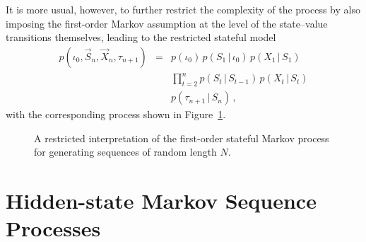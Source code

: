 \documentclass[a4paper]{article}
\begin{document}
It is more usual, however, to further restrict the complexity of the process 
by also imposing the first-order Markov assumption at the level
of the state--value transitions themselves, leading to the restricted stateful  model
\begin{eqnarray}
p(\iota_0,\vec{S}_n,\vec{X}_n,\tau_{n+1}) & = & 
p(\iota_0)\,p(S_1\,|\,\iota_0)\,p(X_1\,|\,S_1)
\nonumber\\&&
\prod_{t=2}^{n}p(S_t\,|\,S_{t-1})
\,p(X_t\,|\,S_t)
\nonumber\\&&
p(\tau_{n+1}\,|\,S_n)
\,,
\label{eq:1-stateful-markov-model}
\end{eqnarray}
with the corresponding process shown in Figure~\ref{fig:1-stateful-1-process}.
\begin{figure}[hbt]
\centering
{}
\caption{A restricted interpretation of the first-order stateful Markov process for generating sequences of random length $N$.}
\label{fig:1-stateful-1-process}
\end{figure}

\section{Hidden-state Markov Sequence Processes}
\end{document}
